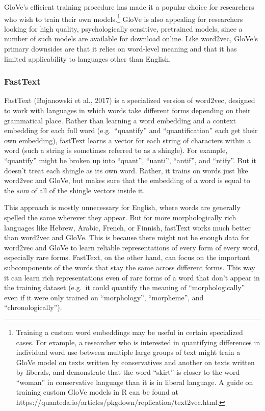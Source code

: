 \documentclass[
  man,
  floatsintext,
  longtable,
  nolmodern,
  notxfonts,
  notimes,
  colorlinks=true,linkcolor=blue,citecolor=blue,urlcolor=blue]{apa7}
\begin{document}
GloVe's efficient training procedure has made it a popular choice for
researchers who wish to train their own models.\footnote{Training a
  custom word embeddings may be useful in certain specialized cases. For
  example, a researcher who is interested in quantifying differences in
  individual word use between multiple large groups of text might train
  a GloVe model on texts written by conservatives and another on texts
  written by liberals, and demonstrate that the word ``skirt'' is closer
  to the word ``woman'' in conservative language than it is in liberal
  language. A guide on training custom GloVe models in R can be found at
  https://quanteda.io/articles/pkgdown/replication/text2vec.html.} GloVe
is also appealing for researchers looking for high quality,
psychologically sensitive, pretrained models, since a number of such
models are available for download online. Like word2vec, GloVe's primary
downsides are that it relies on word-level meaning and that it has
limited applicability to languages other than English.

\subsubsection{FastText}\label{fasttext}

FastText (Bojanowski et al., 2017) is a specialized version of word2vec,
designed to work with languages in which words take different forms
depending on their grammatical place. Rather than learning a word
embedding and a context embedding for each full word (e.g.~``quantify''
and ``quantification'' each get their own embedding), fastText learns a
vector for each string of characters within a word (such a string is
sometimes referred to as a shingle). For example, ``quantify'' might be
broken up into ``quant'', ``uanti'', ``antif'', and ``ntify''. But it
doesn't treat each shingle as its own word. Rather, it trains on words
just like word2vec and GloVe, but makes sure that the embedding of a
word is equal to the \emph{sum} of all of the shingle vectors inside it.

This approach is mostly unnecessary for English, where words are
generally spelled the same wherever they appear. But for more
morphologically rich languages like Hebrew, Arabic, French, or Finnish,
fastText works much better than word2vec and GloVe. This is because
there might not be enough data for word2vec and GloVe to learn reliable
representations of every form of every word, especially rare forms.
FastText, on the other hand, can focus on the important subcomponents of
the words that stay the same across different forms. This way it can
learn rich representations even of rare forms of a word that don't
appear in the training dataset (e.g.~it could quantify the meaning of
``morphologically'' even if it were only trained on ``morphology'',
``morpheme'', and ``chronologically'').
\end{document}
